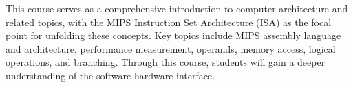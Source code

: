 This course serves as a comprehensive introduction to computer architecture and related topics, with the MIPS Instruction Set Architecture (ISA) as the focal point for unfolding these concepts. Key topics include MIPS assembly language and architecture, performance measurement, operands, memory access, logical operations, and branching. Through this course, students will gain a deeper understanding of the software-hardware interface.